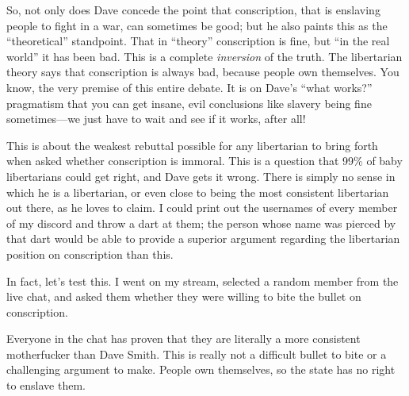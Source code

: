 \documentclass[11pt]{article}
\begin{document}
So, not only does Dave concede the point that conscription, that is enslaving people to fight in a war, can sometimes be good; but he also paints this as the ``theoretical'' standpoint. That in ``theory'' conscription is fine, but ``in the real world'' it has been bad. This is a complete \emph{inversion} of the truth. The libertarian theory says that conscription is always bad, because people own themselves. You know, the very premise of this entire debate. It is on Dave's ``what works?'' pragmatism that you can get insane, evil conclusions like slavery being fine sometimes---we just have to wait and see if it works, after all!

This is about the weakest rebuttal possible for any libertarian to bring forth when asked whether conscription is immoral. This is a question that 99\% of baby libertarians could get right, and Dave gets it wrong. There is simply no sense in which he is a libertarian, or even close to being the most consistent libertarian out there, as he loves to claim. I could print out the usernames of every member of my discord and throw a dart at them; the person whose name was pierced by that dart would be able to provide a superior argument regarding the libertarian position on conscription than this.

In fact, let's test this. I went on my stream, selected a random member from the live chat, and asked them whether they were willing to bite the bullet on conscription.

Everyone in the chat has proven that they are literally a more consistent motherfucker than Dave Smith. This is really not a difficult bullet to bite or a challenging argument to make. People own themselves, so the state has no right to enslave them.
\end{document}

